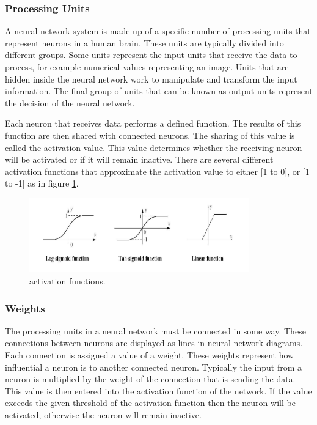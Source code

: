 \documentclass[12pt, a4paper, twoside]{report}
\begin{document}
\subsubsection{Processing Units}
A neural network system is made up of a specific number of processing units that represent neurons in a human brain. These units are typically divided into different groups. Some units represent the input units that receive the data to process, for example numerical values representing an image. Units that are hidden inside the neural network work to manipulate and transform the input information. The final group of units that can be known as output units represent the decision of the neural network.
\par
Each neuron that receives data performs a defined function. The results of this function are then shared with connected neurons. The sharing of this value is called the activation value. This value determines whether the receiving neuron will be activated or if it will remain inactive. There are several different activation functions that approximate the activation value to either [1 to 0], or [1 to -1] as in figure \ref{fig:activation_functions}.

\begin{figure}[ht]
	\centering
	\includegraphics[width=0.85\textwidth]
	{images/chapter4/activation_functions}
	\caption{activation functions.}
	\label{fig:activation_functions}
\end{figure}

\subsubsection{Weights}
The processing units in a neural network must be connected in some way. These connections between neurons are displayed as lines in neural network diagrams. Each connection is assigned a value of a weight. These weights represent how influential a neuron is to another connected neuron. Typically the input from a neuron is multiplied by the weight of the connection that is sending the data. This value is then entered into the activation function of the network. If the value exceeds the given threshold of the activation function then the neuron will be activated, otherwise the neuron will remain inactive.
\end{document}
